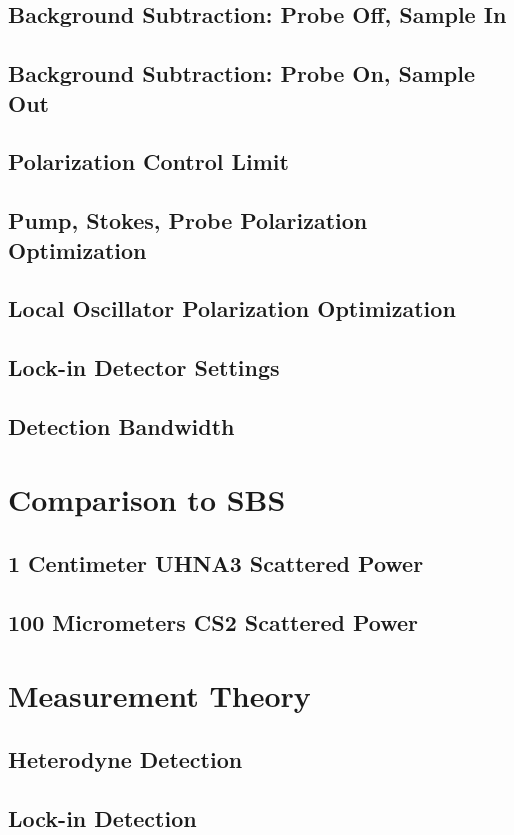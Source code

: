 \documentclass[
sn-nature,
twocolumn
]{sn-jnl}%
\begin{document}
\begin{appendices}
\subsection{Background Subtraction: Probe Off, Sample In}
\subsection{Background Subtraction: Probe On, Sample Out}
\subsection{Polarization Control Limit}
\subsection{Pump, Stokes, Probe Polarization Optimization}
\subsection{Local Oscillator Polarization Optimization}
\subsection{Lock-in Detector Settings}
\subsection{Detection Bandwidth}

\section{Comparison to SBS}
\subsection{1 Centimeter UHNA3 Scattered Power}
\subsection{100 Micrometers CS2 Scattered Power}

\section{Measurement Theory}
\subsection{Heterodyne Detection}
\subsection{Lock-in Detection}


\end{appendices}
\end{document}

